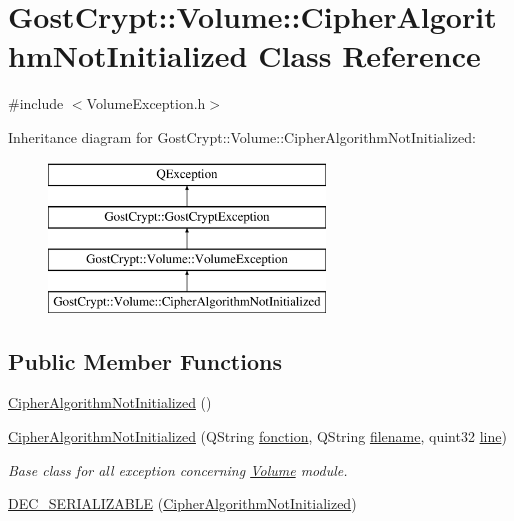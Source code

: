\hypertarget{class_gost_crypt_1_1_volume_1_1_cipher_algorithm_not_initialized}{}\section{Gost\+Crypt\+:\+:Volume\+:\+:Cipher\+Algorithm\+Not\+Initialized Class Reference}
\label{class_gost_crypt_1_1_volume_1_1_cipher_algorithm_not_initialized}


{\ttfamily \#include $<$Volume\+Exception.\+h$>$}

Inheritance diagram for Gost\+Crypt\+:\+:Volume\+:\+:Cipher\+Algorithm\+Not\+Initialized\+:\begin{figure}[H]
\begin{center}
\leavevmode
\includegraphics[height=4.000000cm]{class_gost_crypt_1_1_volume_1_1_cipher_algorithm_not_initialized}
\end{center}
\end{figure}
\subsection*{Public Member Functions}
\begin{DoxyCompactItemize}
\item 
\hyperlink{class_gost_crypt_1_1_volume_1_1_cipher_algorithm_not_initialized_a84f541227b9dacc0cca6ab7c9c452cfe}{Cipher\+Algorithm\+Not\+Initialized} ()
\item 
\hyperlink{class_gost_crypt_1_1_volume_1_1_cipher_algorithm_not_initialized_a87cb2b95a59a109b4611cdc607863355}{Cipher\+Algorithm\+Not\+Initialized} (Q\+String \hyperlink{class_gost_crypt_1_1_gost_crypt_exception_a29b8c93d5efbb1ff369107385725a939}{fonction}, Q\+String \hyperlink{class_gost_crypt_1_1_gost_crypt_exception_a749a12375f4ba9d502623b99d8252f38}{filename}, quint32 \hyperlink{class_gost_crypt_1_1_gost_crypt_exception_abf506d911f12a4e969eea500f90bd32c}{line})
\begin{DoxyCompactList}\small\item\em Base class for all exception concerning \hyperlink{class_gost_crypt_1_1_volume_1_1_volume}{Volume} module. \end{DoxyCompactList}\item 
\hyperlink{class_gost_crypt_1_1_volume_1_1_cipher_algorithm_not_initialized_a160bc89b5921c7d81ed7f121239bf81f}{D\+E\+C\+\_\+\+S\+E\+R\+I\+A\+L\+I\+Z\+A\+B\+LE} (\hyperlink{class_gost_crypt_1_1_volume_1_1_cipher_algorithm_not_initialized}{Cipher\+Algorithm\+Not\+Initialized})
\end{DoxyCompactItemize}
